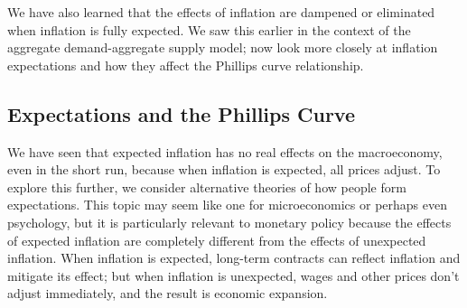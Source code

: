 \documentclass[11pt]{article} %
\begin{document}
We have also learned that the effects of inflation are dampened or eliminated when inflation is fully expected. We saw this earlier in the context of the aggregate demand-aggregate supply model; now look more closely at inflation expectations and how they affect the Phillips curve relationship.

\subsection*{Expectations and the Phillips Curve}
We have seen that expected inflation has no real effects on the macroeconomy, even in the short run, because when inflation is expected, all prices adjust. To explore this further, we consider alternative theories of how people form expectations. This topic may seem like one for microeconomics or perhaps even psychology, but it is particularly relevant to monetary policy because the effects of expected inflation are completely different from the effects of unexpected inflation. When inflation is expected, long-term contracts can reflect inflation and mitigate its effect; but when inflation is unexpected, wages and other prices don't adjust immediately, and the result is economic expansion.
\end{document}
